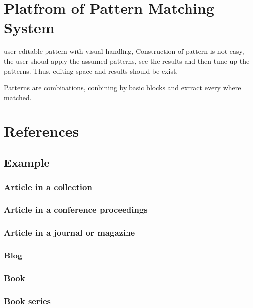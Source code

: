 \documentclass[11pt, onecolumn, twoside, a4paper]{article}
\begin{document}
\section{Platfrom of Pattern Matching System}
user editable pattern with visual handling, Construction of pattern is not easy, the
user shoud apply the assumed patterns, see the results and then tune up the patterns.
Thus, editing space and results should be exist.

Patterns are combinations, conbining by basic blocks and extract every where matched.







\section{References}


\subsection{Example}
\subsubsection{Article in a collection}
\subsubsection{Article in a conference proceedings}
\subsubsection{Article in a journal or magazine}
\subsubsection{Blog}
\subsubsection{Book}
\subsubsection{Book series}
\end{document}
